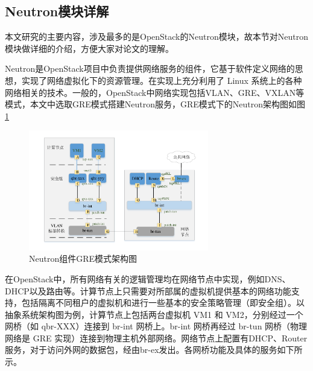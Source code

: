 \subsection{Neutron模块详解}
本文研究的主要内容，涉及最多的是OpenStack的Neutron模块，故本节对Neutron模块做详细的介绍，方便大家对论文的理解。

Neutron是OpenStack项目中负责提供网络服务的组件，它基于软件定义网络的思想，实现了网络虚拟化下的资源管理。在实现上充分利用了 Linux 系统上的各种网络相关的技术。一般的，OpenStack中网络实现包括VLAN、GRE、VXLAN等模式，本文中选取GRE模式搭建Neutron服务，GRE模式下的Neutron架构图如图\ref{fig:neutron}

\begin{figure}[!htb]
  \centering
  \includegraphics[width=0.7\textwidth]{logo/neutron}
  \caption{Neutron组件GRE模式架构图}
  \label{fig:neutron}
\end{figure}

在OpenStack中，所有网络有关的逻辑管理均在网络节点中实现，例如DNS、DHCP以及路由等。计算节点上只需要对所部属的虚拟机提供基本的网络功能支持，包括隔离不同租户的虚拟机和进行一些基本的安全策略管理（即安全组）。以抽象系统架构图为例，计算节点上包括两台虚拟机 VM1 和 VM2，分别经过一个网桥（如 qbr-XXX）连接到 br-int 网桥上。br-int 网桥再经过 br-tun 网桥（物理网络是 GRE 实现）连接到物理主机外部网络。网络节点上配置有DHCP、Router服务，对于访问外网的数据包，经由br-ex发出。各网桥功能及具体的服务如下所示。

